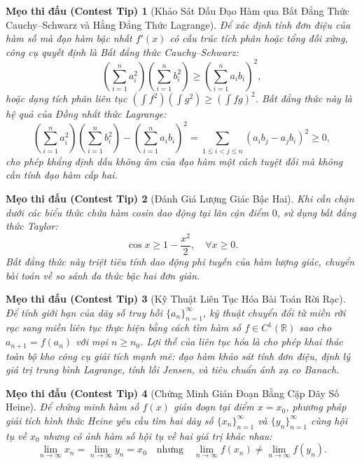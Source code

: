 \documentclass{article}
\newtheorem{tip}{Mẹo thi đấu (Contest Tip)}
\begin{document}
\begin{tip}[Khảo Sát Dấu Đạo Hàm qua Bất Đẳng Thức Cauchy--Schwarz và Hằng Đẳng Thức Lagrange]
Để xác định tính đơn điệu của hàm số mà đạo hàm bậc nhất $f'(x)$ có cấu trúc tích phân hoặc tổng đối xứng, công cụ quyết định là Bất đẳng thức Cauchy--Schwarz:
\begin{equation}
    \left(\sum_{i=1}^n a_i^2\right)\left(\sum_{i=1}^n b_i^2\right) \ge \left(\sum_{i=1}^n a_i b_i\right)^2,
\end{equation}
hoặc dạng tích phân liên tục $\left(\int f^2\right)\left(\int g^2\right) \ge \left(\int fg\right)^2$. Bất đẳng thức này là hệ quả của Đồng nhất thức Lagrange:
\begin{equation}
    \left(\sum_{i=1}^n a_i^2\right)\left(\sum_{i=1}^n b_i^2\right) - \left(\sum_{i=1}^n a_i b_i\right)^2 = \sum_{1 \le i < j \le n} (a_i b_j - a_j b_i)^2 \ge 0,
\end{equation}
cho phép khẳng định dấu không âm của đạo hàm một cách tuyệt đối mà không cần tính đạo hàm cấp hai.
\end{tip}

\begin{tip}[Đánh Giá Lượng Giác Bậc Hai]
Khi cần chặn dưới các biểu thức chứa hàm cosin dao động tại lân cận điểm $0$, sử dụng bất đẳng thức Taylor:
\begin{equation}
    \cos x \ge 1 - \frac{x^2}{2}, \quad \forall x \ge 0.
\end{equation}
Bất đẳng thức này triệt tiêu tính dao động phi tuyến của hàm lượng giác, chuyển bài toán về so sánh đa thức bậc hai đơn giản.
\end{tip}

\begin{tip}[Kỹ Thuật Liên Tục Hóa Bài Toán Rời Rạc]
Để tính giới hạn của dãy số truy hồi $\{a_n\}_{n=1}^\infty$, kỹ thuật chuyển đổi từ miền rời rạc sang miền liên tục thực hiện bằng cách tìm hàm số $f \in C^1(\mathbb{R})$ sao cho $a_{n+1} = f(a_n)$ với mọi $n \ge n_0$. Lợi thế của liên tục hóa là cho phép khai thác toàn bộ kho công cụ giải tích mạnh mẽ: đạo hàm khảo sát tính đơn điệu, định lý giá trị trung bình Lagrange, tính lồi Jensen, và tiêu chuẩn ánh xạ co Banach.
\end{tip}

\begin{tip}[Chứng Minh Gián Đoạn Bằng Cặp Dãy Số Heine]
Để chứng minh hàm số $f(x)$ gián đoạn tại điểm $x = x_0$, phương pháp giải tích hình thức Heine yêu cầu tìm hai dãy số $\{x_n\}_{n=1}^\infty$ và $\{y_n\}_{n=1}^\infty$ cùng hội tụ về $x_0$ nhưng có ảnh hàm số hội tụ về hai giá trị khác nhau:
\begin{equation}
    \lim_{n\to\infty} x_n = \lim_{n\to\infty} y_n = x_0 \quad \text{nhưng} \quad \lim_{n\to\infty} f(x_n) \ne \lim_{n\to\infty} f(y_n).
\end{equation}
\end{tip}
\end{document}
